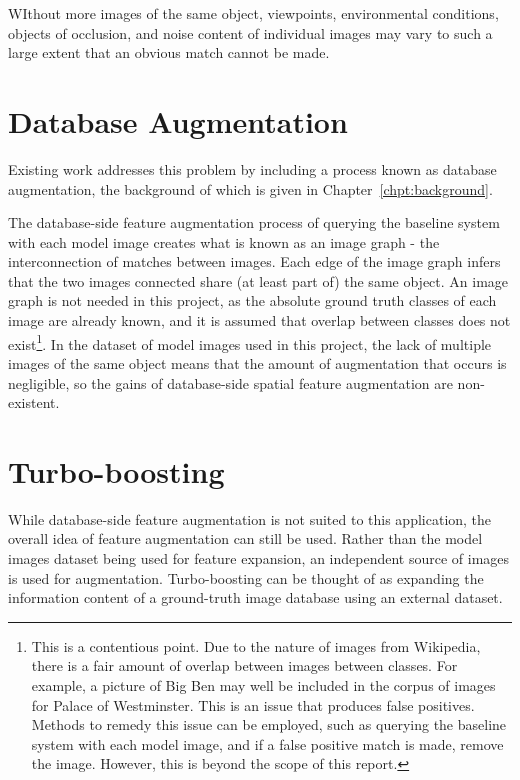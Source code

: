 \documentclass[11pt, onecolumn, a4paper, final]{report} %
\begin{document}
WIthout more images of the same object, viewpoints, environmental conditions, objects of occlusion, and noise content of individual images may vary to such a large extent that an obvious match cannot be made. 

\section{Database Augmentation}

Existing work addresses this problem by including a process known as database augmentation, the background of which is given in Chapter~\ref{chpt:background}.

The database-side feature augmentation process of querying the baseline system with each model image creates what is known as an image graph - the interconnection of matches between images. Each edge of the image graph infers that the two images connected share (at least part of) the same object. An image graph is not needed in this project, as the absolute ground truth classes of each image are already known, and it is assumed that overlap between classes does not exist\footnote{This is a contentious point. Due to the nature of images from Wikipedia, there is a fair amount of overlap between images between classes. For example, a picture of Big Ben may well be included in the corpus of images for Palace of Westminster. This is an issue that produces false positives. Methods to remedy this issue can be employed, such as querying the baseline system with each model image, and if a false positive match is made, remove the image. However, this is beyond the scope of this report.}. In the dataset of model images used in this project, the lack of multiple images of the same object means that the amount of augmentation that occurs is negligible, so the gains of database-side spatial feature augmentation are non-existent.

\section{Turbo-boosting}

While database-side feature augmentation is not suited to this application, the overall idea of feature augmentation can still be used. Rather than the model images dataset being used for feature expansion, an independent source of images is used for augmentation. Turbo-boosting can be thought of as expanding the information content of a ground-truth image database using an external dataset.
\end{document}
